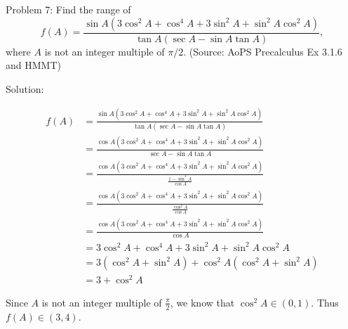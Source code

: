 Problem 7: Find the range of \[f(A) = \frac{\sin A (3 \cos^2 A + \cos^4 A + 3 \sin^2 A + \sin^2 A \cos^2 A)}{\tan A (\sec A - \sin A \tan A)},\]where $A$ is not an integer multiple of $\pi/2$. (Source: AoPS Precalculus Ex 3.1.6 and HMMT)

Solution:

\begin{align*}
f(A) &= \frac{\sin A (3 \cos^2 A + \cos^4 A + 3 \sin^2 A + \sin^2 A \cos^2 A)}{\tan A (\sec A - \sin A \tan A)} \\
&= \frac{\cos A (3 \cos^2 A + \cos^4 A + 3 \sin^2 A + \sin^2 A \cos^2 A)}{\sec A - \sin A \tan A} \\
&= \frac{\cos A (3 \cos^2 A + \cos^4 A + 3 \sin^2 A + \sin^2 A \cos^2 A)}{\frac{1 - \sin^2 A}{\cos A}} \\
&= \frac{\cos A (3 \cos^2 A + \cos^4 A + 3 \sin^2 A + \sin^2 A \cos^2 A)}{\frac{\cos^2 A}{\cos A}} \\
&= \frac{\cos A (3 \cos^2 A + \cos^4 A + 3 \sin^2 A + \sin^2 A \cos^2 A)}{\cos A} \\
&= 3 \cos^2 A + \cos^4 A + 3 \sin^2 A + \sin^2 A \cos^2 A \\
&= 3 (\cos^2 A + \sin^2 A) + \cos^2 A(\cos^2 A + \sin^2 A) \\
&= 3 + \cos^2 A
\end{align*}

Since $A$ is not an integer multiple of $\frac{\pi}{2}$, we know that $\cos^2 A \in (0, 1)$. Thus $\boxed{f(A) \in (3, 4)}$.

